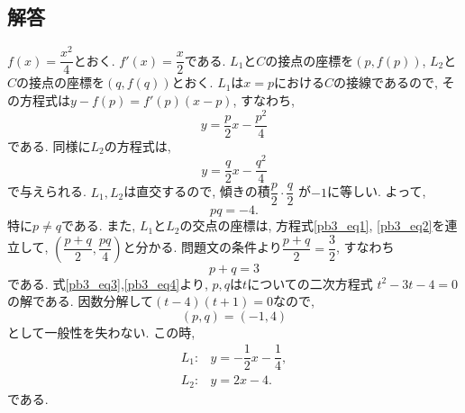 \documentclass[dvipdfmx,a4paper]{jsarticle}
\begin{document}
    \subsection{解答}
    $f(x) = \dfrac{x^2}{4}$とおく. $f'(x) = \dfrac{x}{2}$である. 
    $L_1$と$C$の接点の座標を$(p, f(p))$, $L_2$と$C$の接点の座標を$(q, f(q))$とおく. 
    $L_1$は$x=p$における$C$の接線であるので, その方程式は$y-f(p) = f'(p)(x-p)$, すなわち, 
    \begin{equation} \label{pb3_eq1}
        y = \dfrac{p}{2} x - \dfrac{p^2}{4}
    \end{equation}
    である. 同様に$L_2$の方程式は, 
    \begin{equation} \label{pb3_eq2}
        y = \dfrac{q}{2} x - \dfrac{q^2}{4}
    \end{equation}
    で与えられる. $L_1, L_2$は直交するので, 傾きの積$\dfrac{p}{2} \cdot \dfrac{q}{2}$
    が$-1$に等しい. よって, 
    \begin{equation} \label{pb3_eq3}
        pq = -4.
    \end{equation}
    特に$p \neq q$である. 
    また, $L_1$と$L_2$の交点の座標は, 方程式\eqref{pb3_eq1}, \eqref{pb3_eq2}を連立して, 
    $\left(\dfrac{p+q}{2}, \dfrac{pq}{4}\right)$と分かる. 
    問題文の条件より$\dfrac{p+q}{2} = \dfrac{3}{2}$, すなわち
    \begin{equation} \label{pb3_eq4}
        p + q = 3
    \end{equation}
    である. 式\eqref{pb3_eq3},\eqref{pb3_eq4}より, $p,q$は$t$についての二次方程式
    $t^2 -3t -4 = 0$の解である. 因数分解して$(t-4)(t+1)=0$なので, 
    \begin{equation*}
        (p,q) = (-1, 4)
    \end{equation*}
    として一般性を失わない. この時, 
    \begin{align*}
        L_1 :& y =  -\dfrac{1}{2} x - \dfrac{1}{4}, \\
        L_2 :& y =  2 x - 4.
    \end{align*}
    である. 
\end{document}
